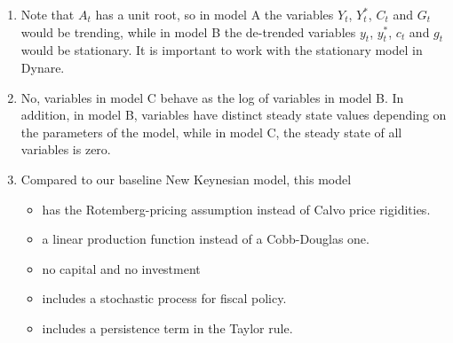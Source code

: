 \begin{enumerate}

\item Note that $A_t$ has a unit root, so in model A the variables $Y_t$, $Y_t^*$, $C_t$ and $G_t$ would be trending,
  while in model B the de-trended variables $y_t$, $y_t^*$, $c_t$ and $g_t$ would be stationary.
It is important to work with the stationary model in Dynare.

\item No, variables in model C behave as the log of variables in model B.
In addition, in model B, variables have distinct steady state values depending on the parameters of the model,
  while in model C, the steady state of all variables is zero.

\item Compared to our baseline New Keynesian model, this model
\begin{itemize}
    \item has the Rotemberg-pricing assumption instead of Calvo price rigidities.
    \item a linear production function instead of a Cobb-Douglas one.
    \item no capital and no investment
    \item includes a stochastic process for fiscal policy.
    \item includes a persistence term in the Taylor rule.
\end{itemize}


\end{enumerate}
